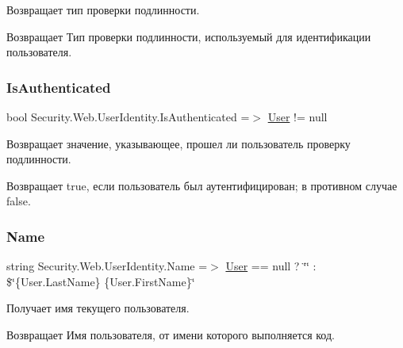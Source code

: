 Возвращает тип проверки подлинности. 

\begin{DoxyReturn}{Возвращает}
Тип проверки подлинности, используемый для идентификации пользователя. 
\end{DoxyReturn}
\mbox{\label{class_security_1_1_web_1_1_user_identity_a65b6fa7f0c23c0aeac354cb36e19da0c}} 
\subsubsection{\texorpdfstring{Is\+Authenticated}{IsAuthenticated}}
{\footnotesize\ttfamily bool Security.\+Web.\+User\+Identity.\+Is\+Authenticated =$>$ \hyperlink{class_security_1_1_web_1_1_user_identity_a0569265b4eb6d169cd2271600e642fcf}{User} != null}



Возвращает значение, указывающее, прошел ли пользователь проверку подлинности. 

\begin{DoxyReturn}{Возвращает}
true, если пользователь был аутентифицирован; в противном случае false. 
\end{DoxyReturn}
\mbox{\label{class_security_1_1_web_1_1_user_identity_a432b449be24dbfb4d8495bf15d6ac1e8}} 
\subsubsection{\texorpdfstring{Name}{Name}}
{\footnotesize\ttfamily string Security.\+Web.\+User\+Identity.\+Name =$>$ \hyperlink{class_security_1_1_web_1_1_user_identity_a0569265b4eb6d169cd2271600e642fcf}{User} == null ? \char`\"{}\char`\"{} \+: \$\char`\"{}\{User.\+Last\+Name\} \{User.\+First\+Name\}\char`\"{}}



Получает имя текущего пользователя. 

\begin{DoxyReturn}{Возвращает}
Имя пользователя, от имени которого выполняется код. 
\end{DoxyReturn}


